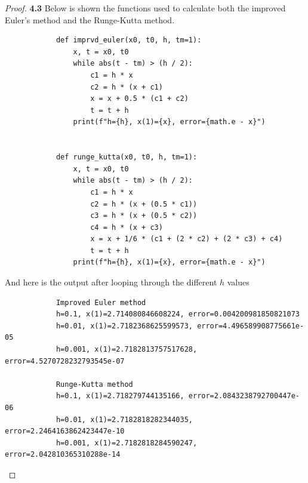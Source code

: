 \documentclass[11pt]{article}
\begin{document}
    \begin{proof}{\textbf{4.3}}
        Below is shown the functions used to calculate both the improved Euler's
        method and the Runge-Kutta method.
        \begin{verbatim}
            def imprvd_euler(x0, t0, h, tm=1):
                x, t = x0, t0
                while abs(t - tm) > (h / 2):
                    c1 = h * x
                    c2 = h * (x + c1)
                    x = x + 0.5 * (c1 + c2)
                    t = t + h
                print(f"h={h}, x(1)={x}, error={math.e - x}")


            def runge_kutta(x0, t0, h, tm=1):
                x, t = x0, t0
                while abs(t - tm) > (h / 2):
                    c1 = h * x
                    c2 = h * (x + (0.5 * c1))
                    c3 = h * (x + (0.5 * c2))
                    c4 = h * (x + c3)
                    x = x + 1/6 * (c1 + (2 * c2) + (2 * c3) + c4)
                    t = t + h
                print(f"h={h}, x(1)={x}, error={math.e - x}")
        \end{verbatim}
        And here is the output after looping through the different $h$ values
        \begin{verbatim}
            Improved Euler method
            h=0.1, x(1)=2.714080846608224, error=0.004200981850821073
            h=0.01, x(1)=2.7182368625599573, error=4.496589908775661e-05
            h=0.001, x(1)=2.7182813757517628, error=4.5270728232793545e-07

            Runge-Kutta method
            h=0.1, x(1)=2.718279744135166, error=2.0843238792700447e-06
            h=0.01, x(1)=2.7182818282344035, error=2.2464163862423447e-10
            h=0.001, x(1)=2.7182818284590247, error=2.042810365310288e-14
        \end{verbatim}
\cleardoublepage
    \end{proof}
\end{document}
